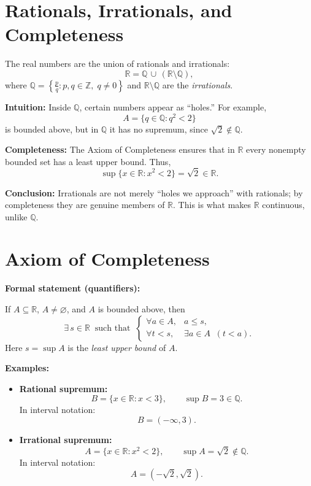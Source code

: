 \documentclass[a4paper,12pt]{article}
\begin{document}
	
	\section*{Rationals, Irrationals, and Completeness}
	
	The real numbers are the union of rationals and irrationals:
	\[
	\mathbb{R} = \mathbb{Q} \,\cup\, (\mathbb{R} \setminus \mathbb{Q}),
	\]
	where $\mathbb{Q} = \left\{ \tfrac{p}{q} : p,q \in \mathbb{Z}, \; q \neq 0 \right\}$ and  
	$\mathbb{R} \setminus \mathbb{Q}$ are the \emph{irrationals}.
	
	\bigskip
	
	\textbf{Intuition:}  
	Inside $\mathbb{Q}$, certain numbers appear as ``holes.''  
	For example,
	\[
	A = \{q \in \mathbb{Q} : q^2 < 2\}
	\]
	is bounded above, but in $\mathbb{Q}$ it has no supremum, since $\sqrt{2} \notin \mathbb{Q}$.
	
	\bigskip
	
	\textbf{Completeness:}  
	The Axiom of Completeness ensures that in $\mathbb{R}$ every nonempty bounded set has a least upper bound.  
	Thus,
	\[
	\sup \{x \in \mathbb{R} : x^2 < 2\} = \sqrt{2} \in \mathbb{R}.
	\]
	
	\bigskip
	
	\textbf{Conclusion:}  
	Irrationals are not merely ``holes we approach'' with rationals; by completeness they are genuine members of $\mathbb{R}$.  
	This is what makes $\mathbb{R}$ continuous, unlike $\mathbb{Q}$.
	
		
		\section*{Axiom of Completeness}
		
		\textbf{Formal statement (quantifiers):}
		
		If $A \subseteq \mathbb{R}$, $A \neq \varnothing$, and $A$ is bounded above, then
		\[
		\exists\, s \in \mathbb{R} \;\; \text{such that} \;\;
		\begin{cases}
			\forall a \in A, & a \leq s, \\[6pt]
			\forall t < s, & \exists a \in A \;\; (t < a).
		\end{cases}
		\]
		Here $s = \sup A$ is the \emph{least upper bound} of $A$.
		
		\bigskip
		
		\textbf{Examples:}
		
		\begin{itemize}
			\item \textbf{Rational supremum:}
			\[
			B = \{x \in \mathbb{R} : x < 3\}, 
			\qquad \sup B = 3 \in \mathbb{Q}.
			\]
			In interval notation:
			\[
			B = (-\infty, 3).
			\]
			
			\item \textbf{Irrational supremum:}
			\[
			A = \{x \in \mathbb{R} : x^2 < 2\}, 
			\qquad \sup A = \sqrt{2} \notin \mathbb{Q}.
			\]
			In interval notation:
			\[
			A = (-\sqrt{2}, \sqrt{2}).
			\]
		\end{itemize}
		
\end{document}
